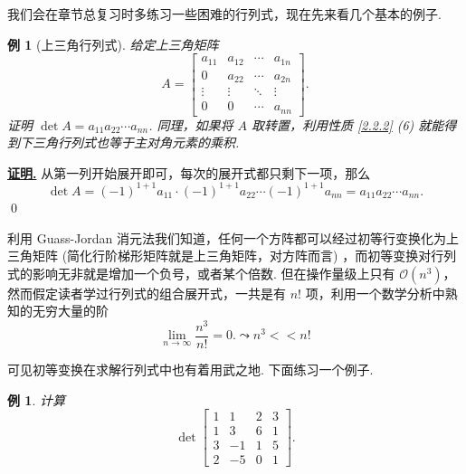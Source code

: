 \documentclass[10pt,openany]{article}
\theoremstyle{thmstyle} %
\theoremstyle{defstyle} %
\theoremstyle{prostyle} %
\theoremstyle{exastyle}
\newtheorem{example}[theorem]{例}
\theoremstyle{remstyle}
\renewenvironment{proof}[1][证明]{\par\underline{\textbf{#1.}} \;\fangsong}{\qed\par}
\begin{document}
我们会在章节总复习时多练习一些困难的行列式，现在先来看几个基本的例子.

\begin{example}[上三角行列式]
	给定上三角矩阵
	\[ A= 
	\begin{bmatrix}
		a_{11} & a_{12} & \cdots & a_{1n} \\
		0      & a_{22} & \cdots & a_{2n} \\
		\vdots & \vdots & \ddots & \vdots \\
		0      & 0      & \cdots & a_{nn}
	\end{bmatrix}. 
	\]
	证明 \( \det A=a_{11}a_{22}\cdots a_{nn} \). 同理，如果将 \( A \) 取转置，利用性质 \ref{2.2.2} (6) 就能得到下三角行列式也等于主对角元素的乘积.
\end{example}

\begin{proof}
	从第一列开始展开即可，每次的展开式都只剩下一项，那么
	\[ \det A= (-1)^{1+1}a_{11} \cdot (-1)^{1+1}a_{22} \cdots (-1)^{1+1} a_{nn}=a_{11}a_{22}\cdots a_{nn}. \]
\end{proof}

利用 Guass-Jordan 消元法我们知道，任何一个方阵都可以经过初等行变换化为上三角矩阵 (简化行阶梯形矩阵就是上三角矩阵，对方阵而言) ，而初等变换对行列式的影响无非就是增加一个负号，或者某个倍数. 但在操作量级上只有 \( \mathcal{O}(n^3) \)，然而假定读者学过行列式的组合展开式，一共是有 \( n! \) 项，利用一个数学分析中熟知的无穷大量的阶
\[ \lim\limits_{n \to \infty} \frac{n^3}{n!}=0. \leadsto n^3<<n!  \]

可见初等变换在求解行列式中也有着用武之地. 下面练习一个例子.

\begin{example}
	计算 \[ \det \begin{bmatrix}
		1 & 1 & 2 & 3 \\
		1 & 3 & 6 & 1 \\
		3 & -1 & 1 & 5 \\
		2 & -5 & 0 & 1
	\end{bmatrix}. \]
\end{example}
\end{document}
